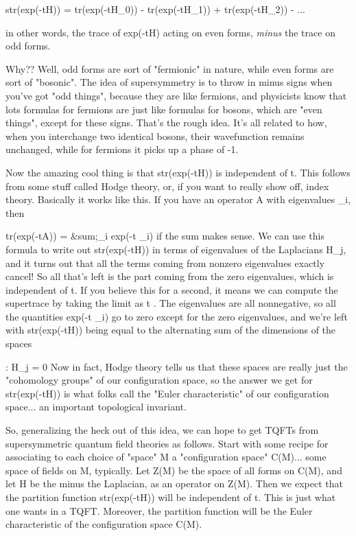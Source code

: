 str(exp(-tH)) = tr(exp(-tH_{0})) - tr(exp(-tH_{1})) + 
tr(exp(-tH_{2})) - ...

in other words, the trace of exp(-tH) acting on even forms,
\emph{minus} the trace on odd forms.  

Why??  Well, odd forms are sort of "fermionic" in nature, while
even forms are sort of "bosonic".  The idea of supersymmetry
is to throw in minus signs when you've got "odd things", because
they are like fermions, and physicists know that lots formulas
for fermions are just like formulas for bosons, which are "even
things", except for these signs.  That's the rough idea.  It's all
related to how, when you interchange two identical bosons, their
wavefunction remains unchanged, while for fermions it picks up
a phase of -1.

Now the amazing cool thing is that str(exp(-tH)) is independent
of t.  This follows from some stuff called Hodge theory, or, if
you want to really show off, index theory.   Basically it works
like this.  If you have an operator A with eigenvalues \lambda _i,
then 

                 tr(exp(-tA)) = &sum;_{i} exp(-t \lambda _{i})
if the sum makes sense.  We can use this formula to write out
str(exp(-tH)) in terms of eigenvalues of the Laplacians H_{j},
and it turns out that all the terms coming from nonzero eigenvalues
exactly cancel!  So all that's left is the part coming from the
zero eigenvalues, which is independent of t.  If you believe 
this for a second, it means we can compute the supertrace by taking 
the limit as t \to  \infty .  The eigenvalues are all nonnegative,
so all the quantities exp(-t \lambda _{i}) go to zero except for the
zero eigenvalues, and we're left with str(exp(-tH)) being equal to
the alternating sum of the dimensions of the spaces

                  {\psi  : H_{j} \psi  = 0}
Now in fact, Hodge theory tells us that these spaces are really just 
the "cohomology groups" of our configuration space, so the answer we
get for str(exp(-tH)) is what folks call the "Euler characteristic" of our 
configuration space... an important topological invariant.   

So, generalizing the heck out of this idea, we can hope to get
TQFTs from supersymmetric quantum field theories as follows.
Start with some recipe for associating to each choice of "space"
M a "configuration space" C(M)... some space of fields on M,
typically.  Let Z(M) be the space of all forms on C(M), and
let H be the minus the Laplacian, as an operator on Z(M).  Then we expect
that the partition function  str(exp(-tH))  will be independent of
t.  This is just what one wants in a TQFT.  Moreover, the partition 
function will be the Euler characteristic of the configuration space C(M).  


